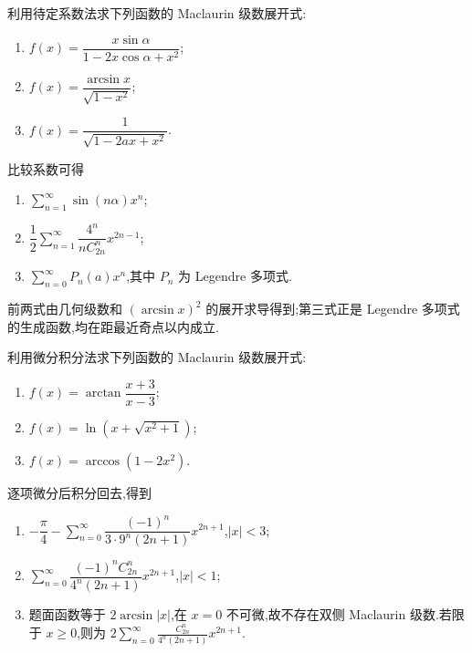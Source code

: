 \begin{example}
    利用待定系数法求下列函数的 Maclaurin 级数展开式:
    \begin{enumerate}
        \item $f(x)=\dfrac{x\sin\alpha}{1-2x\cos\alpha+x^2}$;
        \item $f(x)=\dfrac{\arcsin x}{\sqrt{1-x^2}}$;
        \item $f(x)=\dfrac{1}{\sqrt{1-2ax+x^2}}$.
    \end{enumerate}
\end{example}
\exampleblank

\begin{solution}
    比较系数可得
    \begin{enumerate}
        \item $\displaystyle\sum\limits_{n=1}^{\infty}\sin(n\alpha)x^n$;
        \item $\displaystyle\dfrac{1}{2}\sum\limits_{n=1}^{\infty}
                  \dfrac{4^n}{nC_{2n}^{n}}x^{2n-1}$;
        \item $\displaystyle\sum\limits_{n=0}^{\infty}P_n(a)x^n$,其中 $P_n$ 为 Legendre 多项式.
    \end{enumerate}
    前两式由几何级数和 $(\arcsin x)^2$ 的展开求导得到;第三式正是 Legendre 多项式的生成函数,均在距最近奇点以内成立.
\end{solution}

\begin{example}
    利用微分积分法求下列函数的 Maclaurin 级数展开式:
    \begin{enumerate}
        \item $f(x)=\arctan\dfrac{x+3}{x-3}$;
        \item $f(x)=\ln\left(x+\sqrt{x^2+1}\right)$;
        \item $f(x)=\arccos(1-2x^2)$.
    \end{enumerate}
\end{example}
\exampleblank

\begin{solution}
    逐项微分后积分回去,得到
    \begin{enumerate}
        \item $\displaystyle-\dfrac{\pi}{4}-
                  \sum\limits_{n=0}^{\infty}\dfrac{(-1)^n}{3\cdot9^n(2n+1)}x^{2n+1}$,$|x|<3$;
        \item $\displaystyle\sum\limits_{n=0}^{\infty}
                  \dfrac{(-1)^nC_{2n}^{n}}{4^n(2n+1)}x^{2n+1}$,$|x|<1$;
        \item 题面函数等于 $2\arcsin|x|$,在 $x=0$ 不可微,故不存在双侧 Maclaurin 级数.若限于 $x\geq0$,则为
              $\displaystyle2\sum_{n=0}^{\infty}\frac{C_{2n}^{n}}{4^n(2n+1)}x^{2n+1}$.
    \end{enumerate}
\end{solution}




